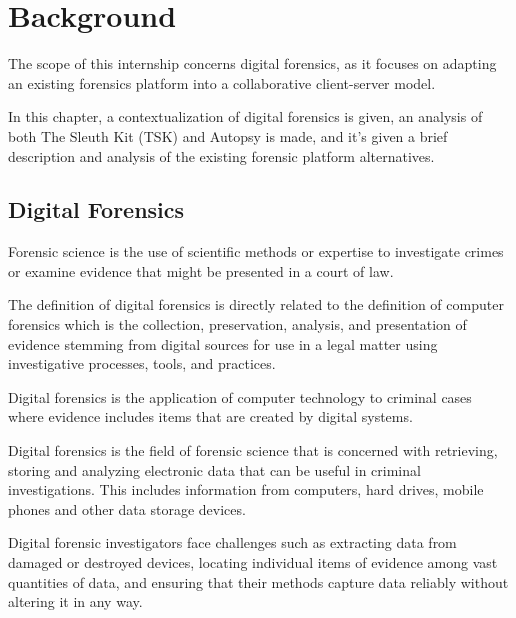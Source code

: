 
\chapter{Background}
\label{ch:background}

The scope of this internship concerns digital forensics, as it focuses on adapting an existing forensics platform into a collaborative client-server model.

In this chapter, a contextualization of digital forensics is given, an analysis of both The Sleuth Kit (TSK) \cite{sleuthkit} and Autopsy is made, and it's given a brief description and analysis of the existing forensic platform alternatives.

\section{Digital Forensics}

Forensic science \cite{nist} is the use of scientific methods or expertise to investigate crimes
or examine evidence that might be presented in a court of law.

The definition of digital forensics is directly related to the definition of
computer forensics which is the collection, preservation, analysis,
and presentation \cite{daniels} of evidence stemming from digital sources for use in a legal matter
using investigative processes, tools, and practices.

Digital forensics \cite{nist2} is the application of computer technology to criminal cases where evidence
includes items that are created by digital systems.

Digital forensics is the field of forensic science that is concerned with retrieving,
storing and analyzing electronic data that can be useful in criminal investigations.
This includes information from computers, hard drives, mobile phones and other data
storage devices.

Digital forensic investigators face challenges such as extracting data from damaged or destroyed
devices, locating individual items of evidence among vast quantities of data,
and ensuring that their methods capture data reliably without altering it in any way.

